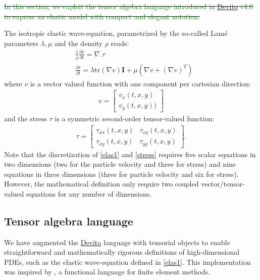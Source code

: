 \documentclass[10pt, conference]{IEEEtran}
\newcommand{\devito}{\href{https://github.com/devitocodes/devito}{Devito} }
\begin{document}
\sout{\textcolor{green}{In this section, we
exploit the tensor algebra language introduced in \devito v4.0 to express
an elastic model with compact and elegant notation.}}

The isotropic elastic wave-equation, parametrized by the so-called Lamé parameters
$\lambda, \mu$ and the density $\rho$ reads:
%
\begin{equation}
\begin{aligned}
&\frac{1}{\rho}\frac{\partial v}{\partial t} = \nabla . \tau \\
&\frac{\partial \tau}{\partial t} = \lambda \mathrm{tr}(\nabla v) \mathbf{I}  + \mu (\nabla v + (\nabla v)^T)
\end{aligned}
\label{elas1}
\end{equation}
%
\noindent
 where $v$ is a vector valued function with one component per cartesian
direction:
%
\begin{equation}
\begin{split}
v =  \begin{bmatrix} v_x(t, x, y) \\ v_y(t, x, y)) \end{bmatrix}
\end{split}
\label{partvel}
\end{equation}
%
 and the stress $\tau$ is a symmetric second-order tensor-valued
function:
%
\begin{equation}
\begin{aligned}
    \tau = \begin{bmatrix}\tau_{xx}(t, x, y) & \tau_{xy}(t, x, y)\\\tau_{xy}(t, x, y) & \tau_{yy}(t, x, y)\end{bmatrix}.
\end{aligned}
\label{stress}
\end{equation}
%
 Note that the discretization of \eqref{elas1} and \eqref{stress} requires five
scalar equations in two dimensions (two for the particle velocity and
three for stress) and nine equations in three dimensions (three for particle velocity
and six for stress). However, the mathematical
definition only require two coupled vector/tensor-valued equations for
any number of dimensions.

\subsection{Tensor algebra language}\label{tensor-algebra-language}

We have augmented the \devito language with tensorial objects to enable
straightforward and mathematically rigorous definitions of
high-dimensional PDEs, such as the elastic wave-equation defined in
\eqref{elas1}. This implementation was inspired by \cite{ufl}, a
functional language for finite element methods.
\end{document}
